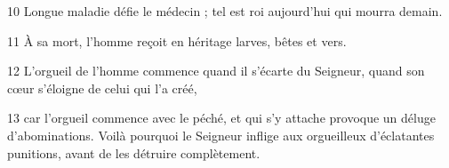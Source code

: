 
10 Longue maladie défie le médecin ; tel est roi aujourd’hui qui mourra demain.

11 À sa mort, l’homme reçoit en héritage larves, bêtes et vers.

12 L’orgueil de l’homme commence quand il s’écarte du Seigneur, quand son cœur s’éloigne de celui qui l’a créé,

13 car l’orgueil commence avec le péché, et qui s’y attache provoque un déluge d’abominations. Voilà pourquoi le Seigneur inflige aux orgueilleux d’éclatantes punitions, avant de les détruire complètement.